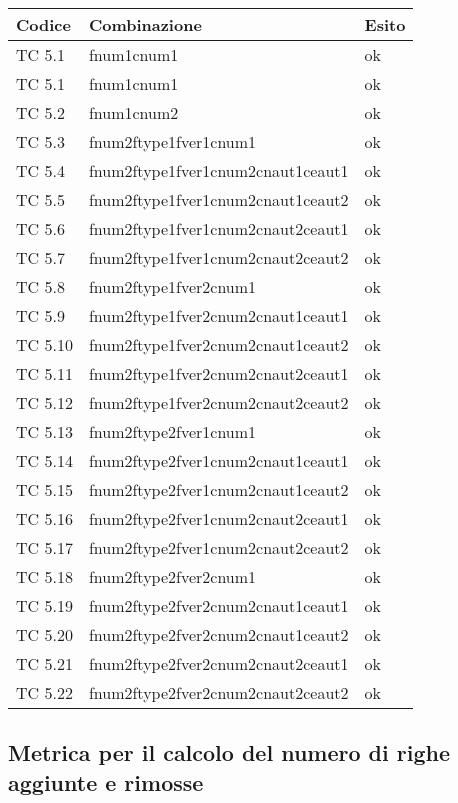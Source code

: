\begin{tabular}{|p{3cm}|p{7cm}|p{3cm}|}
	\hline
	\rowcolor{Gray}
	\textbf{Codice} & \textbf{Combinazione} & \textbf{Esito}\tabularnewline
	\hline
	TC 5.1			& fnum1cnum1				& ok \tabularnewline
	\hline
	TC 5.1			& fnum1cnum1				& ok \tabularnewline
	\hline
	TC 5.2			& fnum1cnum2				& ok \tabularnewline
	\hline
	TC 5.3			& fnum2ftype1fver1cnum1			& ok \tabularnewline
	\hline
	TC 5.4			& fnum2ftype1fver1cnum2cnaut1ceaut1	& ok \tabularnewline
	\hline
	TC 5.5			& fnum2ftype1fver1cnum2cnaut1ceaut2	& ok \tabularnewline
	\hline
	TC 5.6			& fnum2ftype1fver1cnum2cnaut2ceaut1	& ok \tabularnewline
	\hline
	TC 5.7			& fnum2ftype1fver1cnum2cnaut2ceaut2	& ok \tabularnewline
	\hline
	TC 5.8			& fnum2ftype1fver2cnum1			& ok \tabularnewline
	\hline
	TC 5.9			& fnum2ftype1fver2cnum2cnaut1ceaut1	& ok \tabularnewline
	\hline
	TC 5.10			& fnum2ftype1fver2cnum2cnaut1ceaut2	& ok \tabularnewline
	\hline
	TC 5.11			& fnum2ftype1fver2cnum2cnaut2ceaut1	& ok \tabularnewline
	\hline
	TC 5.12			& fnum2ftype1fver2cnum2cnaut2ceaut2	& ok \tabularnewline
	\hline
	TC 5.13			& fnum2ftype2fver1cnum1			& ok \tabularnewline
	\hline
	TC 5.14			& fnum2ftype2fver1cnum2cnaut1ceaut1	& ok \tabularnewline
	\hline
	TC 5.15			& fnum2ftype2fver1cnum2cnaut1ceaut2	& ok \tabularnewline
	\hline
	TC 5.16			& fnum2ftype2fver1cnum2cnaut2ceaut1	& ok \tabularnewline
	\hline
	TC 5.17			& fnum2ftype2fver1cnum2cnaut2ceaut2	& ok \tabularnewline
	\hline
	TC 5.18			& fnum2ftype2fver2cnum1			& ok \tabularnewline
	\hline
	TC 5.19			& fnum2ftype2fver2cnum2cnaut1ceaut1	& ok \tabularnewline
	\hline
	TC 5.20			& fnum2ftype2fver2cnum2cnaut1ceaut2	& ok \tabularnewline
	\hline
	TC 5.21			& fnum2ftype2fver2cnum2cnaut2ceaut1	& ok \tabularnewline
	\hline
	TC 5.22			& fnum2ftype2fver2cnum2cnaut2ceaut2	& ok \tabularnewline
	\hline
\end{tabular}
\clearpage




\subsection{Metrica per il calcolo del numero di righe aggiunte e rimosse}

